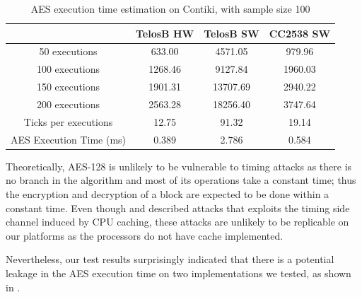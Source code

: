 \begin{table}[ht!]
	\center
	\begin{tabular}{|c|c|c|c|}
	\hline
	                               & TelosB HW & TelosB SW & CC2538 SW \\ \hline
	50 executions                      & 633.00                  & 4571.05                  & 979.96                  \\ \hline
	100 executions                     & 1268.46                  & 9127.84                 & 1960.03                  \\ \hline
	150 executions                     & 1901.31                  & 13707.69                & 2940.22                  \\ \hline
	200 executions                     & 2563.28                  & 18256.40                & 3747.64                  \\ \hline
        Ticks per executions & 12.75                   & 91.32                   & 19.14                   \\ \hline
	AES Execution Time (ms)   & 0.389                & 2.786               & 0.584                \\ \hline
	\end{tabular}
	\caption{AES execution time estimation on Contiki, with sample size 100}
	\label{Tbl: AES execution time estimation of Contiki}
\end{table}

Theoretically, AES-128 is unlikely to be vulnerable to timing attacks as there is no branch in the algorithm and most of its operations take a constant time; thus the encryption and decryption of a block are expected to be done within a constant time. Even though \cite{Cache-Timing1} and \cite{Cache-Timing2} described attacks that exploits the timing side channel induced by CPU caching, these attacks are unlikely to be replicable on our platforms as the processors do not have cache implemented. 

Nevertheless, our test results surprisingly indicated that there is a potential leakage in the AES execution time on two implementations we tested, as shown in .

